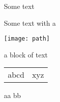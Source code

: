 Some text

Some text with a %

\texttt{[image: path]}


{
    a block of text
}

\begin{tabular}{lr}
    abcd & xyz
\end{tabular}

aa { bb }